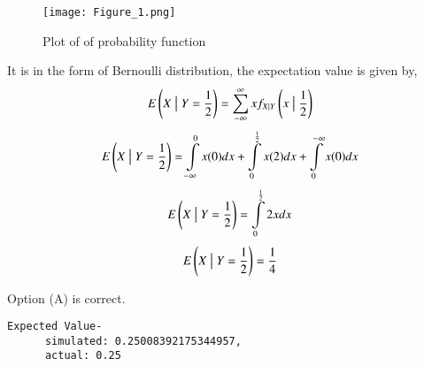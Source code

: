 \documentclass[journal,12pt,twocolumn]{IEEEtran}
\begin{document}
\begin{figure}[h!]
    \centering
    \texttt{[image: Figure\_1.png]}
    \caption{Plot of of probability function}
    \label{fig:plot}
\end{figure}

It is in the form of Bernoulli distribution, the expectation value is given by,
\begin{align}
    E\left(X\bigm| Y=\frac{1}{2}\right)=\sum\limits_{-\infty}^{\infty}x f_{X\mid Y}\left(x \bigm| \frac{1}{2}\right)
\end{align}
\begin{align}
    E\left(X\bigm| Y=\frac{1}{2}\right)=\int\limits_{-\infty}^0x(0)d x + \int\limits_0^\frac{1}{2}x(2)d x + \int\limits^{-\infty}_0x(0)d x
\end{align}
\begin{align}
    E\left(X\bigm| Y=\frac{1}{2}\right)=\int\limits_0^\frac{1}{2}2x d x
\end{align}
\begin{align}
    E\left(X\bigm| Y=\frac{1}{2}\right)=\frac{1}{4}
\end{align}

Option (A) is correct.
\begin{lstlisting}
Expected Value-
      simulated: 0.25008392175344957,
      actual: 0.25
\end{lstlisting}
\end{document}
